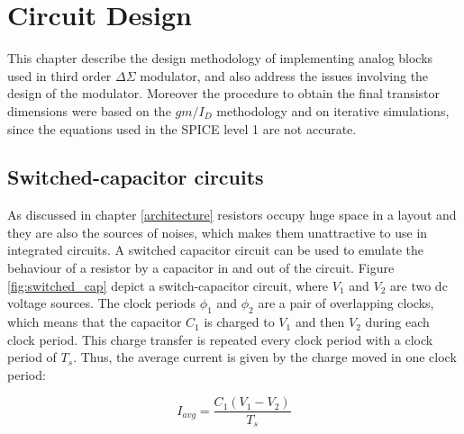 \chapter{Circuit Design}
This chapter describe the design methodology of implementing analog blocks used in third order $\Delta\Sigma$ modulator, and also address the issues involving the design of the modulator. 
Moreover the procedure to obtain the final transistor dimensions were based on the $gm/I_D$ methodology and on iterative simulations, since the equations used in the SPICE level 1 are not accurate. 

\section{Switched-capacitor circuits}

As discussed in chapter \ref{architecture} resistors occupy huge space in a layout and they are also the sources of noises, which makes them unattractive to use in integrated circuits. A switched capacitor circuit can be used to emulate the behaviour of a resistor by a capacitor in and out of the circuit. Figure \ref{fig:switched_cap} depict a switch-capacitor circuit, where \textit{$V_1$} and \textit{$V_2$} are two dc voltage sources. The clock periods $\phi_1$ and $\phi_2$ are a pair of overlapping clocks, which means that the capacitor $C_1$ is charged to $V_1$ and then $V_2$ during each clock period. This charge transfer is repeated every clock period with a clock period of $T_s$. Thus, the average current is given by the charge moved in one clock period\cite{Johns}:  

\begin{equation}\label{sw_res}
    I_{avg} = \frac{C_1(V_1 - V_2)}{T_s}
\end{equation}

